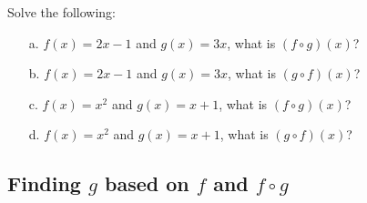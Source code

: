 \documentclass[a4paper,12pt]{book}
\newcounter{question}
\begin{document}
    \begin{questionNOGRADE}{\thequestion}

        Solve the following:

        \begin{itemize}
            \item[a.]   $f(x) = 2x-1$ and $g(x) = 3x$, what is $(f \circ g)(x)$?

            \item[b.]   $f(x) = 2x-1$ and $g(x) = 3x$, what is $(g \circ f)(x)$?

            \item[c.]   $f(x) = x^{2}$ and $g(x) = x+1$, what is $(f \circ g)(x)$?
            
            \item[d.]   $f(x) = x^{2}$ and $g(x) = x+1$, what is $(g \circ f)(x)$?
        \end{itemize}
        
    \end{questionNOGRADE}

    \notonkey{ \newpage }{ \hrulefill }

    \subsection{Finding $g$ based on $f$ and $f \circ g$}
\end{document}
